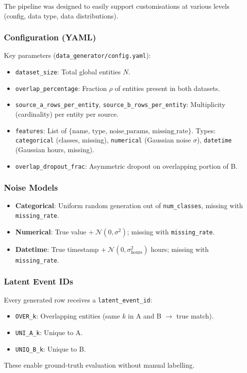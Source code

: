 The pipeline was designed to easily support customisations at various levels (config, data type, data distributions).

\subsubsection{Configuration (YAML)}
\label{sec:datagen_config}
Key parameters (\texttt{data\_generator/config.yaml}):
\begin{itemize}
	\item \texttt{dataset\_size}: Total global entities $N$.
	\item \texttt{overlap\_percentage}: Fraction $\rho$ of entities present in both datasets.
	\item \texttt{source\_a\_rows\_per\_entity}, \texttt{source\_b\_rows\_per\_entity}: Multiplicity (cardinality) per entity per source.
	\item \texttt{features}: List of $\{ \text{name, type, noise\_params, missing\_rate} \}$.
	      Types: \texttt{categorical} (classes, missing), \texttt{numerical} (Gaussian noise $\sigma$), \texttt{datetime} (Gaussian hours, missing).
	\item \texttt{overlap\_dropout\_frac}: Asymmetric dropout on overlapping portion of B.
\end{itemize}

\subsubsection{Noise Models}
\label{sec:noise_models}
\begin{itemize}
	\item \textbf{Categorical}: Uniform random generation out of \texttt{num\_classes}, missing with \texttt{missing\_rate}.
	\item \textbf{Numerical}: True value $+\ \mathcal{N}(0, \sigma^2)$; missing with \texttt{missing\_rate}.
	\item \textbf{Datetime}: True timestamp $+\ \mathcal{N}(0, \sigma_{\text{hours}}^2)$ hours; missing with \texttt{missing\_rate}.
\end{itemize}

\subsubsection{Latent Event IDs}
Every generated row receives a \texttt{latent\_event\_id}:
\begin{itemize}
	\item \texttt{OVER\_k}: Overlapping entities (same $k$ in A and B $\to$ true match).
	\item \texttt{UNI\_A\_k}: Unique to A.
	\item \texttt{UNIQ\_B\_k}: Unique to B.
\end{itemize}
These enable ground-truth evaluation without manual labelling.


